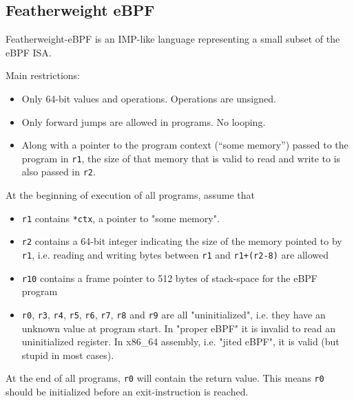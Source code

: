 \subsection{Featherweight eBPF}
\label{subsec:featherweight_ebpf}
Featherweight-eBPF is an IMP-like language representing a small subset of the eBPF ISA.

Main restrictions:
\begin{itemize}
\item Only 64-bit values and operations. Operations are unsigned. 
  \item Only forward jumps are allowed in programs. No looping.
\item Along with a pointer to the program context (``some memory'') passed to the program in \texttt{r1}, the size of that memory that is valid to read and write to is also passed in \texttt{r2}. 
\end{itemize}


At the beginning of execution of all programs, assume that
\begin{itemize}
\item \texttt{r1} contains \texttt{*ctx}, a pointer to "some memory".
\item \texttt{r2} contains a 64-bit integer indicating the size of the memory pointed to by \texttt{r1}, i.e. reading and writing bytes between \texttt{r1} and \texttt{r1+(r2-8)} are allowed
\item \texttt{r10} contains a frame pointer to 512 bytes of stack-space for the eBPF program
\item \texttt{r0}, \texttt{r3}, \texttt{r4}, \texttt{r5}, \texttt{r6}, \texttt{r7}, \texttt{r8} and \texttt{r9} are all "uninitialized", i.e. they have an unknown value at program start. In "proper eBPF" it is invalid to read an uninitialized register. In x86\_64 assembly, i.e. "jited eBPF", it is valid (but stupid in most cases).

\end{itemize}

At the end of all programs, \texttt{r0} will contain the return value. 
This means \texttt{r0} should be initialized before an exit-instruction is reached.


